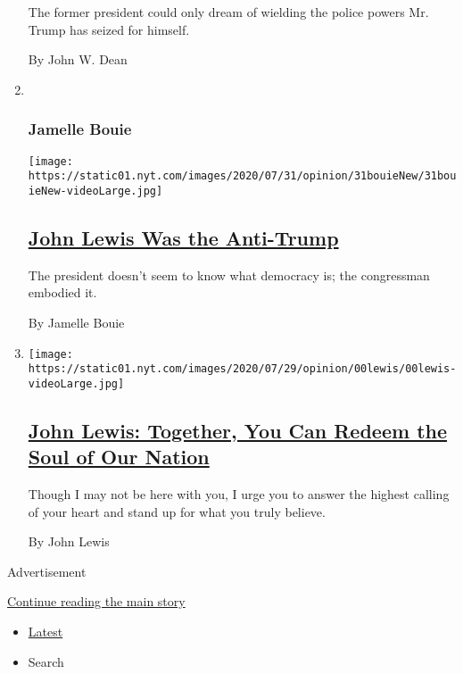 \begin{enumerate}
  The former president could only dream of wielding the police powers
  Mr. Trump has seized for himself.

  By John W. Dean
\item ~
  \hypertarget{jamelle-bouie}{%
  \subsubsection{Jamelle Bouie}\label{jamelle-bouie}}

  \texttt{[image: https://static01.nyt.com/images/2020/07/31/opinion/31bouieNew/31bouieNew-videoLarge.jpg]}

  \hypertarget{john-lewis-was-the-anti-trump}{%
  \subsection{\texorpdfstring{\href{/2020/07/31/opinion/john-lewis-trump-election-2020.html}{John
  Lewis Was the
  Anti-Trump}}{John Lewis Was the Anti-Trump}}\label{john-lewis-was-the-anti-trump}}

  The president doesn't seem to know what democracy is; the congressman
  embodied it.

  By Jamelle Bouie
\item
  \texttt{[image: https://static01.nyt.com/images/2020/07/29/opinion/00lewis/00lewis-videoLarge.jpg]}

  \hypertarget{john-lewis-together-you-can-redeem-the-soul-of-our-nation}{%
  \subsection{\texorpdfstring{\href{/2020/07/30/opinion/john-lewis-civil-rights-america.html}{John
  Lewis: Together, You Can Redeem the Soul of Our
  Nation}}{John Lewis: Together, You Can Redeem the Soul of Our Nation}}\label{john-lewis-together-you-can-redeem-the-soul-of-our-nation}}

  Though I may not be here with you, I urge you to answer the highest
  calling of your heart and stand up for what you truly believe.

  By John Lewis
\end{enumerate}

Advertisement

\protect\hyperlink{after-mid1}{Continue reading the main story}

\begin{itemize}
\tightlist
\item
  \protect\hyperlink{stream-panel}{Latest}
\item
  Search
\end{itemize}


